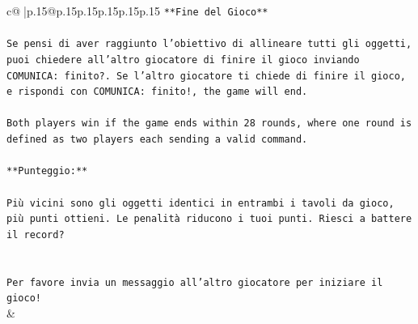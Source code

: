 \documentclass{article}
\begin{document}
{\begin{supertabular}{c@{$\;$}|p{.15\linewidth}@{}p{.15\linewidth}p{.15\linewidth}p{.15\linewidth}p{.15\linewidth}p{.15\linewidth}}
{{{\texttt{**Fine del Gioco**} \\
\\ 
\texttt{Se pensi di aver raggiunto l'obiettivo di allineare tutti gli oggetti, puoi chiedere all'altro giocatore di finire il gioco inviando COMUNICA: finito?. Se l'altro giocatore ti chiede di finire il gioco, e rispondi con COMUNICA: finito!, the game will end.} \\
\\ 
\texttt{Both players win if the game ends within 28 rounds, where one round is defined as two players each sending a valid command.} \\
\\ 
\texttt{**Punteggio:**} \\
\\ 
\texttt{Più vicini sono gli oggetti identici in entrambi i tavoli da gioco, più punti ottieni. Le penalità riducono i tuoi punti. Riesci a battere il record?} \\
\\ 
\\ 
\texttt{Per favore invia un messaggio all'altro giocatore per iniziare il gioco!} \\
            }
        }
    }
    & \\ \\


\end{supertabular}}
\end{document}
